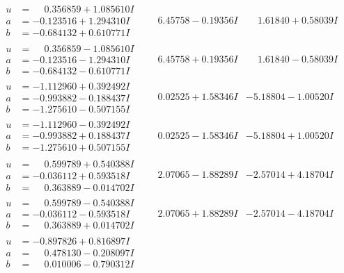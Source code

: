 \documentclass[1p]{elsarticle_modified}
\theoremstyle{definition}
\begin{document}
$$\begin{array}{c|c|c}
\begin{aligned}
u &= \phantom{-}0.356859 + 1.085610 I \\
a &= -0.123516 + 1.294310 I \\
b &= -0.684132 + 0.610771 I\end{aligned}
 & \phantom{-}6.45758 - 0.19356 I & \phantom{-}1.61840 + 0.58039 I \\ \hline\begin{aligned}
u &= \phantom{-}0.356859 - 1.085610 I \\
a &= -0.123516 - 1.294310 I \\
b &= -0.684132 - 0.610771 I\end{aligned}
 & \phantom{-}6.45758 + 0.19356 I & \phantom{-}1.61840 - 0.58039 I \\ \hline\begin{aligned}
u &= -1.112960 + 0.392492 I \\
a &= -0.993882 - 0.188437 I \\
b &= -1.275610 - 0.507155 I\end{aligned}
 & \phantom{-}0.02525 + 1.58346 I & -5.18804 - 1.00520 I \\ \hline\begin{aligned}
u &= -1.112960 - 0.392492 I \\
a &= -0.993882 + 0.188437 I \\
b &= -1.275610 + 0.507155 I\end{aligned}
 & \phantom{-}0.02525 - 1.58346 I & -5.18804 + 1.00520 I \\ \hline\begin{aligned}
u &= \phantom{-}0.599789 + 0.540388 I \\
a &= -0.036112 + 0.593518 I \\
b &= \phantom{-}0.363889 - 0.014702 I\end{aligned}
 & \phantom{-}2.07065 - 1.88289 I & -2.57014 + 4.18704 I \\ \hline\begin{aligned}
u &= \phantom{-}0.599789 - 0.540388 I \\
a &= -0.036112 - 0.593518 I \\
b &= \phantom{-}0.363889 + 0.014702 I\end{aligned}
 & \phantom{-}2.07065 + 1.88289 I & -2.57014 - 4.18704 I \\ \hline\begin{aligned}
u &= -0.897826 + 0.816897 I \\
a &= \phantom{-}0.478130 - 0.208097 I \\
b &= \phantom{-}0.010006 - 0.790312 I\end{aligned}

\end{array}$$
\end{document}
